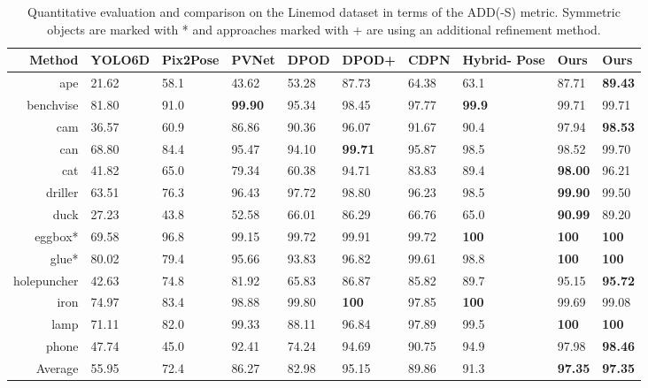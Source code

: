 \documentclass[twocolumn, 10pt, letterpaper]{article}
\begin{document}
\begin{table*}
\begin{tabularx}{\textwidth}{ | r | X  X  X  X  X  X  X | X  X |}
 \hline
 Method & YOLO6D \cite{YOLO6D} & Pix2Pose \cite{Pix2Pose} & PVNet \cite{PVNet} & DPOD \cite{DPOD} & DPOD+ \cite{DPOD} & CDPN \cite{CDPN} & Hybrid- Pose \cite{HybridPose} & \textbf{Ours}  & \textbf{Ours}   \\
 \hline
 ape            & 21.62 & 58.1 & 43.62 & 53.28 & 87.73 & 64.38 & 63.1 & 87.71 & \textbf{89.43} \\
 benchvise      & 81.80 & 91.0 & \textbf{99.90} & 95.34 & 98.45 & 97.77 & \textbf{99.9} & 99.71 & 99.71 \\
 cam            & 36.57 & 60.9 & 86.86 & 90.36 & 96.07 & 91.67 & 90.4 & 97.94 & \textbf{98.53} \\
 can            & 68.80 & 84.4 & 95.47 & 94.10 & \textbf{99.71} & 95.87 & 98.5 & 98.52 & 99.70 \\
 cat            & 41.82 & 65.0 & 79.34 & 60.38 & 94.71 & 83.83 & 89.4 & \textbf{98.00} & 96.21 \\
 driller        & 63.51 & 76.3 & 96.43 & 97.72 & 98.80 & 96.23 & 98.5 & \textbf{99.90} & 99.50 \\
 duck           & 27.23 & 43.8 & 52.58 & 66.01 & 86.29 & 66.76 & 65.0 & \textbf{90.99} & 89.20 \\
 eggbox*        & 69.58 & 96.8 & 99.15 & 99.72 & 99.91 & 99.72 & \textbf{100} & \textbf{100} & \textbf{100} \\
 glue*          & 80.02 & 79.4 & 95.66 & 93.83 & 96.82 & 99.61 & 98.8 & \textbf{100} & \textbf{100} \\
 holepuncher    & 42.63 & 74.8 & 81.92 & 65.83 & 86.87 & 85.82 & 89.7 & 95.15 & \textbf{95.72} \\
 iron           & 74.97 & 83.4 & 98.88 & 99.80 & \textbf{100} & 97.85 & \textbf{100} & 99.69 & 99.08 \\
 lamp           & 71.11 & 82.0 & 99.33 & 88.11 & 96.84 & 97.89 & 99.5 & \textbf{100} & \textbf{100} \\
 phone          & 47.74 & 45.0 & 92.41 & 74.24 & 94.69 & 90.75 & 94.9 & 97.98 & \textbf{98.46} \\
 \hline
 Average & 55.95 & 72.4 & 86.27 & 82.98 & 95.15 & 89.86 & 91.3 & \textbf{97.35} & \textbf{97.35} \\
 \hline
\end{tabularx}
\caption{Quantitative evaluation and comparison on the Linemod dataset in terms of the ADD(-S) metric. Symmetric objects are marked with * and approaches marked with + are using an additional refinement method.}
\label{table_linemod_comparison}
\end{table*}
\end{document}
